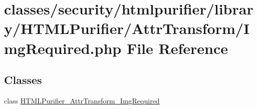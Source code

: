 \hypertarget{ImgRequired_8php}{\section{classes/security/htmlpurifier/library/\+H\+T\+M\+L\+Purifier/\+Attr\+Transform/\+Img\+Required.php File Reference}
\label{ImgRequired_8php}
}
\subsection*{Classes}
\begin{DoxyCompactItemize}
\item 
class \hyperlink{classHTMLPurifier__AttrTransform__ImgRequired}{H\+T\+M\+L\+Purifier\+\_\+\+Attr\+Transform\+\_\+\+Img\+Required}
\end{DoxyCompactItemize}
